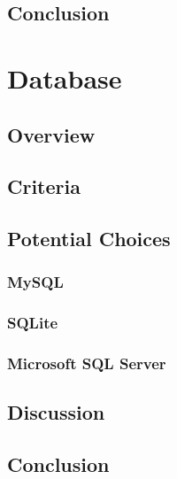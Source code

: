 \documentclass[onecolumn, draftclsnofoot,10pt, compsoc]{IEEEtran}
\begin{document}
\subsection{Conclusion}

\section{Database}

\subsection{Overview}

\subsection{Criteria}

\subsection{Potential Choices}

\subsubsection{MySQL}

\subsubsection{SQLite}

\subsubsection{Microsoft SQL Server}

\subsection{Discussion}

\subsection{Conclusion}
\end{document}
